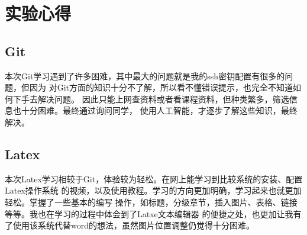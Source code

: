 \documentclass{ctexart}
\begin{document}
\section{实验心得}
    \subsection{Git}
    本次Git学习遇到了许多困难，其中最大的问题就是我的ssh密钥配置有很多的问题，但因为
    对Git方面的知识十分不了解，所以看不懂错误提示，也完全不知道如何下手去解决问题。
    因此只能上网查资料或者看课程资料，但种类繁多，筛选信息也十分困难。最终通过询问同学，
    使用人工智能，才逐步了解这些知识，最终解决。
    \subsection{Latex}
    本次Latex学习相较于Git，体验较为轻松。在网上能学习到比较系统的安装、配置Latex操作系统
    的视频，以及使用教程。学习的方向更加明确，学习起来也就更加轻松。掌握了一些基本的编写
    操作，如标题，分级章节，插入图片、表格、链接等等。我也在学习的过程中体会到了Latxe文本编辑器
    的便捷之处，也更加让我有了使用该系统代替word的想法，虽然图片位置调整仍觉得十分困难。
\end{document}
